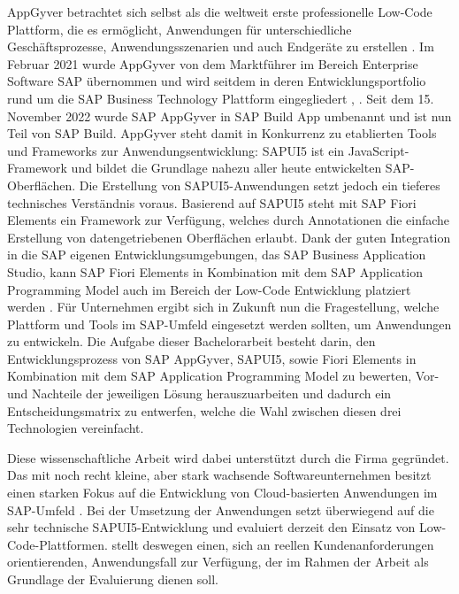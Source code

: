 AppGyver betrachtet sich selbst als die weltweit erste professionelle Low-Code Plattform, die es ermöglicht, Anwendungen für unterschiedliche Geschäftsprozesse, Anwendungsszenarien und auch Endgeräte zu erstellen \cite{lcnc:appgyv}. Im Februar 2021 wurde AppGyver von dem Marktführer im Bereich Enterprise Software SAP übernommen und wird seitdem in deren Entwicklungsportfolio rund um die SAP Business Technology Plattform eingegliedert \cite{lcnc:ncp}, \cite{lcnc:appgyvint}. Seit dem 15. November 2022 wurde SAP AppGyver in SAP Build App umbenannt und ist nun Teil von SAP Build. AppGyver steht damit in Konkurrenz zu etablierten Tools und Frameworks zur Anwendungsentwicklung: SAPUI5 ist ein JavaScript-Framework und bildet die Grundlage nahezu aller heute entwickelten SAP-Oberflächen. Die Erstellung von SAPUI5-Anwendungen setzt jedoch ein tieferes technisches Verständnis voraus. Basierend auf SAPUI5 steht mit SAP Fiori Elements ein Framework zur Verfügung, welches durch Annotationen die einfache Erstellung von datengetriebenen Oberflächen erlaubt. Dank der guten Integration in die SAP eigenen Entwicklungsumgebungen, das SAP Business Application Studio, kann SAP Fiori Elements in Kombination mit dem SAP Application Programming Model auch im Bereich der Low-Code Entwicklung platziert werden \cite{lcnc:fiori}. Für Unternehmen ergibt sich in Zukunft nun die Fragestellung, welche Plattform und Tools im SAP-Umfeld eingesetzt werden sollten, um Anwendungen zu entwickeln. Die Aufgabe dieser Bachelorarbeit besteht darin, den Entwicklungsprozess von SAP AppGyver, SAPUI5, sowie Fiori Elements in Kombination mit dem SAP Application Programming Model zu bewerten, Vor- und Nachteile der jeweiligen Lösung herauszuarbeiten und dadurch ein Entscheidungsmatrix zu entwerfen, welche die Wahl zwischen diesen drei Technologien vereinfacht.

Diese wissenschaftliche Arbeit wird dabei unterstützt durch die Firma  gegründet. Das mit  noch recht kleine, aber stark wachsende Softwareunternehmen besitzt einen starken Fokus auf die Entwicklung von Cloud-basierten Anwendungen im SAP-Umfeld \cite{lcnc:p36}.  Bei der Umsetzung der Anwendungen setzt  überwiegend auf die sehr technische SAPUI5-Entwicklung und evaluiert derzeit den Einsatz von Low-Code-Plattformen.  stellt deswegen einen, sich an reellen Kundenanforderungen orientierenden, Anwendungsfall zur Verfügung, der im Rahmen der Arbeit als Grundlage der Evaluierung dienen soll. 

